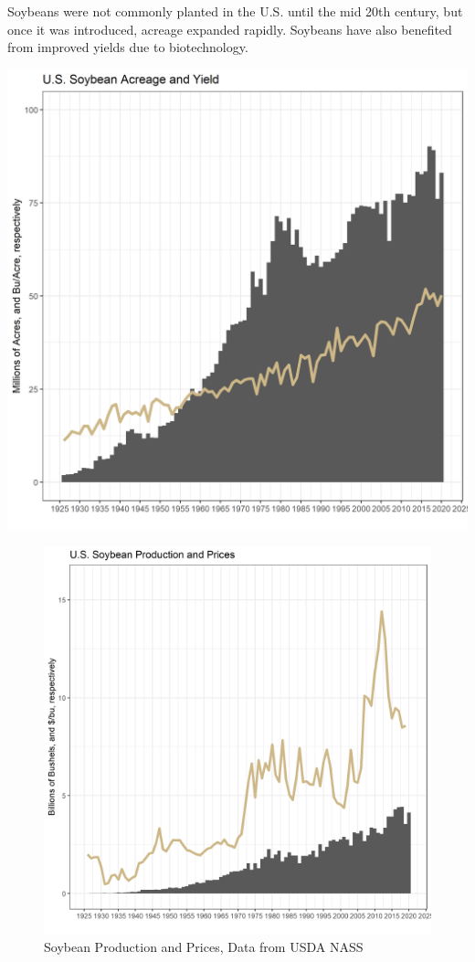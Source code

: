 \documentclass[
]{book}
\begin{document}
Soybeans were not commonly planted in the U.S. until the mid 20th century, but once it was introduced, acreage expanded rapidly. Soybeans have also benefited from improved yields due to biotechnology.

\href{Soybean\%20Acres\%20and\%20Yield,\%20Data\%20from\%20USDA\%20NASS}{\includegraphics{assets/PrimerforGrain_SoyAcandY.png}}

\begin{figure}
\centering
\includegraphics{assets/PrimerforGrain_SoyProdand$.png}
\caption{Soybean Production and Prices, Data from USDA NASS}
\end{figure}
\end{document}
